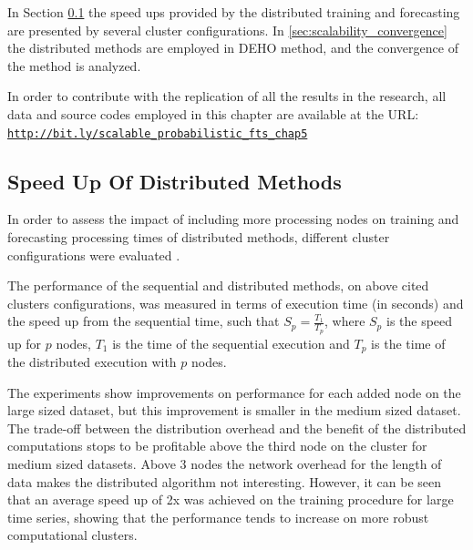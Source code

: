 In Section \ref{sec:scalability_speedup} the speed ups provided by the distributed training and forecasting are presented by several cluster configurations. In \ref{sec:scalability_convergence} the distributed methods are employed in DEHO method, and the convergence of the method is analyzed.

In order to contribute with the replication of all the results in the research, all data and source codes employed in this chapter are available at the URL:
\texttt{\url{http://bit.ly/scalable_probabilistic_fts_chap5}}

\subsection{Speed Up Of Distributed Methods}
\label{sec:scalability_speedup}

In order to assess the impact of including more processing nodes on training and forecasting processing times of distributed methods, different cluster configurations were evaluated .

The performance of the sequential and distributed methods, on above cited clusters configurations, was measured in terms of execution time (in seconds) and the speed up from the sequential time, such that $S_p = \frac{T_1}{T_p}$, where $S_p$ is the speed up for $p$ nodes, $T_1$ is the time of the sequential execution and $T_p$ is the time of the distributed execution with $p$ nodes. 

The experiments show improvements on performance for each added node on the large sized dataset, but this improvement is smaller in the medium sized dataset.  The trade-off between the distribution overhead and the benefit of the distributed computations stops to be profitable above the third node on the cluster for medium sized datasets. Above 3 nodes the network overhead for the length of data makes the distributed algorithm not interesting. However, it can be seen that an average speed up of 2x was achieved on the training procedure for large time series, showing that the performance tends to increase on more robust computational clusters.  


